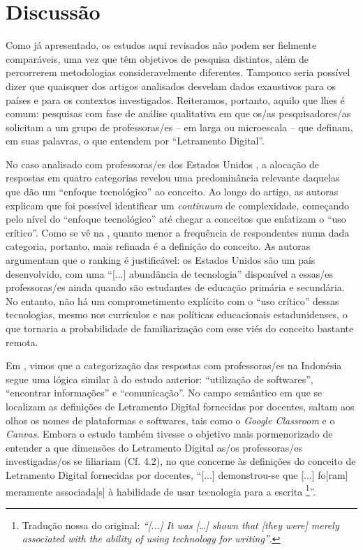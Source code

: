 \documentclass[portuguese]{textolivre}
\begin{document}
\section{Discussão}

Como já apresentado, os estudos aqui revisados não podem ser fielmente comparáveis, uma vez que têm objetivos de pesquisa distintos, além de percorrerem metodologias consideravelmente diferentes. Tampouco seria possível dizer que quaisquer dos artigos analisados desvelam dados exaustivos para os países e para os contextos investigados. Reiteramos, portanto, aquilo que lhes é comum: pesquisas com fase de análise qualitativa em que os/as pesquisadores/as solicitam a um grupo de professoras/es – em larga ou microescala – que definam, em suas palavras, o que entendem por “Letramento Digital”.

No caso analisado com professoras/es dos Estados Unidos \cite{list_framework_2020}, a alocação de respostas em quatro categorias revelou uma predominância relevante daquelas que dão um “enfoque tecnológico” ao conceito. Ao longo do artigo, as autoras explicam que foi possível identificar um \textit{continuum} de complexidade, começando pelo nível do “enfoque tecnológico” até chegar a conceitos que enfatizam o “uso crítico”. Como se vê na , quanto menor a frequência de respondentes numa dada categoria, portanto, mais refinada é a definição do conceito. As autoras argumentam que o ranking é justificável: os Estados Unidos são um país desenvolvido, com uma “[...] abundância de tecnologia” \cite[p.~2]{list_framework_2020} disponível a essas/es professoras/es ainda quando são estudantes de educação primária e secundária. No entanto, não há um comprometimento explícito com o “uso crítico” dessas tecnologias, mesmo nos currículos e nas políticas educacionais estadunidenses, o que tornaria a probabilidade de familiarização com esse viés do conceito bastante remota.

Em \textcite{nabhan_pre-service_2021}, vimos que a categorização das respostas com professoras/es na Indonésia segue uma lógica similar à do estudo anterior: “utilização de softwares”, “encontrar informações” e “comunicação”. No campo semântico em que se localizam as definições de Letramento Digital fornecidas por docentes, saltam aos olhos os nomes de plataformas e softwares, tais como o \textit{Google Classroom} e o \textit{Canvas}. Embora o estudo também tivesse o objetivo mais pormenorizado de entender a que dimensões do Letramento Digital as/os professoras/es investigadas/os se filiariam (Cf. 4.2), no que concerne às definições do conceito de Letramento Digital fornecidas por docentes, “[...] demonstrou-se que [...] fo[ram] meramente associada[s] à habilidade de usar tecnologia para a escrita \cite[p.~196]{nabhan_pre-service_2021}\footnote{Tradução nossa do original: \textit{“[...] It was [\ldots] shown that [they were] merely associated with the ability of using technology for writing”}.}”.
\end{document}
